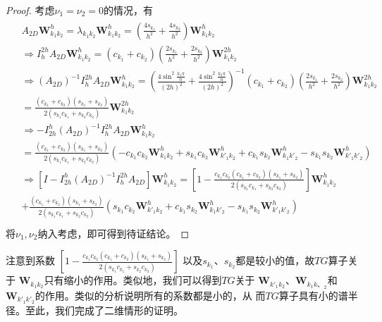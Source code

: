 \documentclass[a4paper,twoside]{ctexart}
\begin{document}
   \begin{proof}
     考虑$\nu_1 = \nu_2 = 0$的情况，有
     \begin{eqnarray}
    \begin{aligned}
      &A_{2D}\mathbf{W}_{k_1k_2}^h =
      \lambda_{k_1k_2}\mathbf{W}_{k_1k_2}^h =
      \left(\frac{4s_{k_1}}{h^2}+\frac{4s_{k_2}}{h^2}
      \right)\mathbf{W}_{k_1k_2}^h\\
      &\Rightarrow I_h^{2h}A_{2D}\mathbf{W}_{k_1k_2}^h = (c_{k_1}+c_{k_2})\left(\frac{2s_{k_1}}{h^2}+\frac{2s_{k_2}}{h^2}
      \right)\mathbf{W}_{k_1k_2}^{2h}\\
      &\Rightarrow (A_{2D})^{-1}I_h^{2h}A_{2D}\mathbf{W}_{k_1k_2}^h = (\frac{4\sin^2{\frac{k_1\pi}{n}}}{(2h)^2}+\frac{4\sin^2{\frac{k_2\pi}{n}}}{(2h)^2})^{-1}(c_{k_1}+c_{k_2})\left(\frac{2s_{k_1}}{h^2}+\frac{2s_{k_2}}{h^2}
      \right)\mathbf{W}_{k_1k_2}^{2h}\\
      & =
      \frac{(c_{k_1}+c_{k_2})(s_{k_1}+s_{k_2})}{2(s_{k_1}c_{k_1}+s_{k_2}c_{k_2})}\mathbf{W}_{k_1k_2}^{2h}\\
      &\Rightarrow -I_{2h}^h
      (A_{2D})^{-1}I_h^{2h}A_{2D}\mathbf{W}_{k_1k_2}^h \\
      &=
      \frac{(c_{k_1}+c_{k_2})(s_{k_1}+s_{k_2})}{2(s_{k_1}c_{k_1}+s_{k_2}c_{k_2})}\left(-c_{k_1}c_{k_2}\mathbf{W}_{k_1
          k_2}^{h}+s_{k_1}c_{k_2}\mathbf{W}_{k'_1
          k_2}^h+c_{k_1}s_{k_2}\mathbf{W}_{k_1
          k'_2}^h-s_{k_1}s_{k_2}\mathbf{W}_{k'_1 k'_2}^h\right)\\
      &\Rightarrow [I-I_{2h}^h
      (A_{2D})^{-1}I_h^{2h}A_{2D}]\mathbf{W}_{k_1k_2}^h = [1-\frac{c_{k_1}c_{k_2}(c_{k_1}+c_{k_2})(s_{k_1}+s_{k_2})}{2(s_{k_1}c_{k_1}+s_{k_2}c_{k_2})}]\mathbf{W}_{k_1
        k_2}^{h}\\
      &+\frac{(c_{k_1}+c_{k_2})(s_{k_1}+s_{k_2})}{2(s_{k_1}c_{k_1}+s_{k_2}c_{k_2})}\left(s_{k_1}c_{k_2}\mathbf{W}_{k'_1
          k_2}^h+c_{k_1}s_{k_2}\mathbf{W}_{k_1
          k'_2}^h-s_{k_1}s_{k_2}\mathbf{W}_{k'_1 k'_2}^h\right)\\
    \end{aligned}
     \end{eqnarray}
     将$\nu_1,\nu_2$纳入考虑，即可得到待证结论。
   \end{proof}

   注意到系数
   $[1-\frac{c_{k_1}c_{k_2}(c_{k_1}+c_{k_2})(s_{k_1}+s_{k_2})}{2(s_{k_1}c_{k_1}+s_{k_2}c_{k_2})}]$
   以及$s_{k_1}$、$s_{k_2}$都是较小的值，故$TG$算子关于
   $\mathbf{W}_{k_1k_2}$只有缩小的作用。类似地，我们可以得到$TG$关于
   $\mathbf{W}_{k'_1k_2}$、$\mathbf{W}_{k_1k、_2}$和
   $\mathbf{W}_{k'_1k'_2}$的作用。类似的分析说明所有的系数都是小的，从
   而$TG$算子具有小的谱半径。至此，我们完成了二维情形的证明。
\newpage
\end{document}
